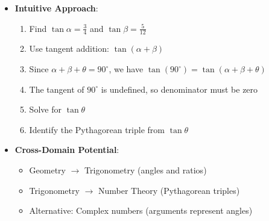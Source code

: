 \documentclass[12pt]{article}
\begin{document}
\begin{problemconfigbox}
\begin{itemize}[leftmargin=*]
    \item \textbf{Intuitive Approach}: 
    \begin{enumerate}
        \item Find $\tan\alpha = \frac{3}{4}$ and $\tan\beta = \frac{5}{12}$
        \item Use tangent addition: $\tan(\alpha + \beta)$
        \item Since $\alpha + \beta + \theta = 90^{\circ}$, we have $\tan(90^{\circ}) = \tan(\alpha + \beta + \theta)$
        \item The tangent of $90^{\circ}$ is undefined, so denominator must be zero
        \item Solve for $\tan\theta$
        \item Identify the Pythagorean triple from $\tan\theta$
    \end{enumerate}
    
    \item \textbf{Cross-Domain Potential}: 
    \begin{itemize}
        \item Geometry $\rightarrow$ Trigonometry (angles and ratios)
        \item Trigonometry $\rightarrow$ Number Theory (Pythagorean triples)
        \item Alternative: Complex numbers (arguments represent angles)
    \end{itemize}
\end{itemize}
\end{problemconfigbox}
\end{document}
